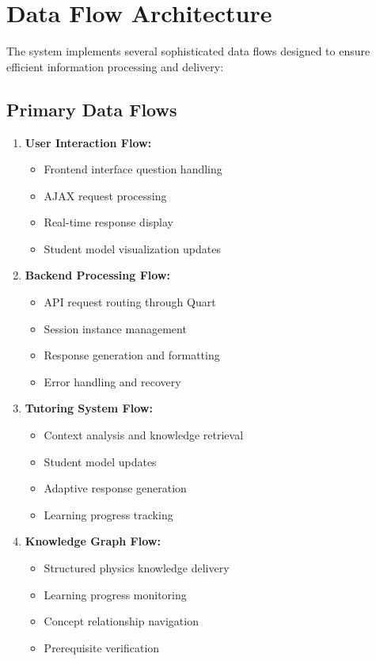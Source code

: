 \section{Data Flow Architecture}
\label{sec:data-flow}

The system implements several sophisticated data flows designed to ensure efficient information processing and delivery:

\subsection{Primary Data Flows}
\label{subsec:primary-flows}

\begin{enumerate}
    \item \textbf{User Interaction Flow:}
        \begin{itemize}
            \item Frontend interface question handling
            \item AJAX request processing
            \item Real-time response display
            \item Student model visualization updates
        \end{itemize}
    
    \item \textbf{Backend Processing Flow:}
        \begin{itemize}
            \item API request routing through Quart
            \item Session instance management
            \item Response generation and formatting
            \item Error handling and recovery
        \end{itemize}
    
    \item \textbf{Tutoring System Flow:}
        \begin{itemize}
            \item Context analysis and knowledge retrieval
            \item Student model updates
            \item Adaptive response generation
            \item Learning progress tracking
        \end{itemize}
    
    \item \textbf{Knowledge Graph Flow:}
        \begin{itemize}
            \item Structured physics knowledge delivery
            \item Learning progress monitoring
            \item Concept relationship navigation
            \item Prerequisite verification
        \end{itemize}
    

\end{enumerate}

